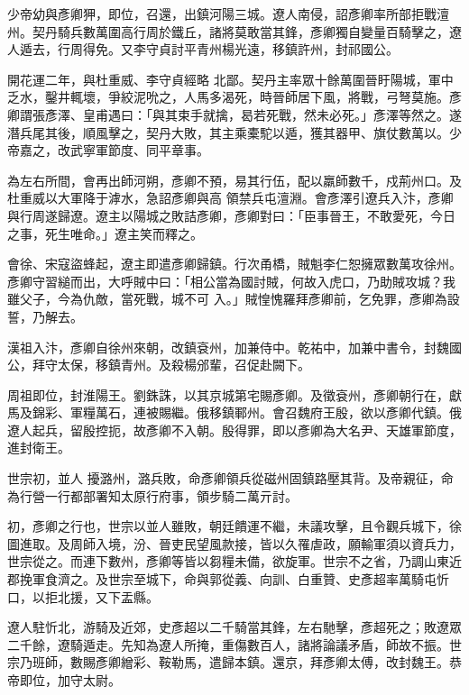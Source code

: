 \begin{pinyinscope}
 少帝幼與彥卿狎，即位，召還，出鎮河陽三城。遼人南侵，詔彥卿率所部拒戰澶州。契丹騎兵數萬圍高行周於鐵丘，諸將莫敢當其鋒，彥卿獨自變量百騎擊之，遼人遁去，行周得免。又李守貞討平青州楊光遠，移鎮許州，封祁國公。



 開花運二年，與杜重威、李守貞經略
 北鄙。契丹主率眾十餘萬圍晉盱陽城，軍中乏水，鑿井輒壞，爭絞泥吮之，人馬多渴死，時晉師居下風，將戰，弓弩莫施。彥卿謂張彥澤、皇甫遇曰：「與其束手就擒，曷若死戰，然未必死。」彥澤等然之。遂潛兵尾其後，順風擊之，契丹大敗，其主乘橐駝以遁，獲其器甲、旗仗數萬以。少帝嘉之，改武寧軍節度、同平章事。



 為左右所間，會再出師河朔，彥卿不預，易其行伍，配以羸師數千，戍荊州口。及杜重威以大軍降于滹水，急詔彥卿與高
 領禁兵屯澶淵。會彥澤引遼兵入汴，彥卿與行周遂歸遼。遼主以陽城之敗詰彥卿，彥卿對曰：「臣事晉王，不敢愛死，今日之事，死生唯命。」遼主笑而釋之。



 會徐、宋寇盜蜂起，遼主即遣彥卿歸鎮。行次甬橋，賊魁李仁恕擁眾數萬攻徐州。彥卿守習縋而出，大呼賊中曰：「相公當為國討賊，何故入虎口，乃助賊攻城？我雖父子，今為仇敵，當死戰，城不可
 入。」賊惶愧羅拜彥卿前，乞免罪，彥卿為設誓，乃解去。



 漢祖入汴，彥卿自徐州來朝，改鎮袞州，加兼侍中。乾祐中，加兼中書令，封魏國公，拜守太保，移鎮青州。及殺楊邠輩，召促赴闕下。



 周祖即位，封淮陽王。劉銖誅，以其京城第宅賜彥卿。及徵袞州，彥卿朝行在，獻馬及錦彩、軍糧萬石，連被賜繼。俄移鎮鄆州。會召魏府王殷，欲以彥卿代鎮。俄遼人起兵，留殷控扼，故彥卿不入朝。殷得罪，即以彥卿為大名尹、天雄軍節度，進封衛王。



 世宗初，並人
 擾潞州，潞兵敗，命彥卿領兵從磁州固鎮路壓其背。及帝親征，命為行營一行都部署知太原行府事，領步騎二萬亓討。



 初，彥卿之行也，世宗以並人雖敗，朝廷饋運不繼，未議攻擊，且令觀兵城下，徐圖進取。及周師入境，汾、晉吏民望風款接，皆以久罹虐政，願輸軍須以資兵力，世宗從之。而連下數州，彥卿等皆以芻糧未備，欲旋軍。世宗不之省，乃調山東近郡挽軍食濟之。及世宗至城下，命與郭從義、向訓、白重贊、史彥超率萬騎屯忻
 口，以拒北援，又下盂縣。



 遼人駐忻北，游騎及近郊，史彥超以二千騎當其鋒，左右馳擊，彥超死之；敗遼眾二千餘，遼騎遁走。先知為遼人所掩，重傷數百人，諸將論議矛盾，師故不振。世宗乃班師，數賜彥卿繒彩、鞍勒馬，遣歸本鎮。還京，拜彥卿太傅，改封魏王。恭帝即位，加守太尉。




\end{pinyinscope}
